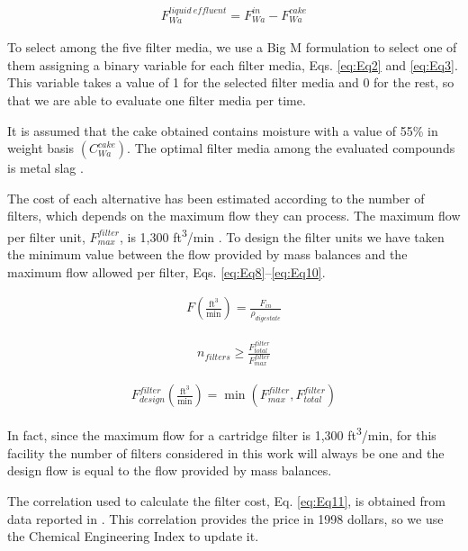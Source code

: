 \begin{refsection}[referencesCh2]
\begin{align}
	F_{Wa}^{{{liquid \ effluent}}} = F_{Wa}^{{in}} - F_{Wa}^{{cake}} \label{eq:Eq7}
\end{align}

To select among the five filter media, we use a Big M formulation to select one of them assigning a binary variable {} for each filter media, Eqs. \ref{eq:Eq2} and \ref{eq:Eq3}. This variable takes a value of 1 for the selected filter media and 0 for the rest, so that we are able to evaluate one filter media per time.

It is assumed that the cake obtained contains moisture with a value of 55\% in weight basis $\left(C_{Wa}^{cake}\right)$. The optimal filter media among the evaluated compounds is metal slag \citep{li2015study}.

The cost of each alternative has been estimated according to the number of filters, which depends on the maximum flow they can process. The maximum flow per filter unit, $F_{max}^{{filter}}$, is 1,300 ft\textsuperscript{3}/min \citep{loh2002process}. To design the filter units we have taken the minimum value between the flow provided by mass balances and the maximum flow allowed per filter, Eqs. \ref{eq:Eq8}–\ref{eq:Eq10}.

\begin{align}
	F\left( {\frac{\text{ft}^3}{\text{min}}} \right) = \frac{{{F_{in}}}}{{{\rho _{{digestate}}}}} \label{eq:Eq8}
\end{align}

\begin{align}
	{n}_{{filters}} \ge \frac{F_{total}^{{filter}}}{F_{{max}}^{{filter}}} 	\label{eq:Eq9}
\end{align}

\begin{align}
	F_{design}^{{filter}}\left( {\frac{\text{ft}^3}{\text{min}}} \right) = \min \left( {F_{max}^{{filter}},F_{total}^{{filter}}} \right) \label{eq:Eq10}
\end{align}

In fact, since the maximum flow for a cartridge filter is 1,300 ft\textsuperscript{3}/min, for this facility the number of filters considered in this work will always be one and the design flow is equal to the flow provided by mass balances.

The correlation used to calculate the filter cost, Eq. \ref{eq:Eq11}, is obtained from data reported in \citet{loh2002process}. This correlation provides the price in 1998 dollars, so we use the Chemical Engineering Index to update it.


\end{refsection}
